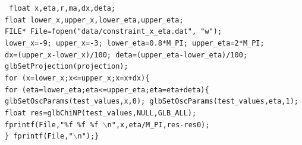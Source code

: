 \documentclass[aps,prd,nofootinbib,preprint]{revtex4}
\begin{document}
\texttt{     float x,eta,r,ma,dx,deta;\\
     float lower\_x,upper\_x,lower\_eta,upper\_eta;\\
     FILE* File=fopen("data/constraint\_x\_eta.dat", "w");\\
    lower\_x=-9; upper\_x=-3; lower\_eta=0.8*M\_PI; upper\_eta=2*M\_PI;\\
    dx=(upper\_x-lower\_x)/100; deta=(upper\_eta-lower\_eta)/100;\\
        glbSetProjection(projection);\\
   for (x=lower\_x;x<=upper\_x;x=x+dx)\{ \\
    for (eta=lower\_eta;eta<=upper\_eta;eta=eta+deta)\{\\
     glbSetOscParams(test\_values,x,0); glbSetOscParams(test\_values,eta,1);\\
        float res=glbChiNP(test\_values,NULL,GLB\_ALL);\\
            fprintf(File,"\%f \%f  \%f $\backslash$n",x,eta/M\_PI,res-res0);\\
                     \} fprintf(File,"$\backslash$n");\}\\
}
\end{document}
